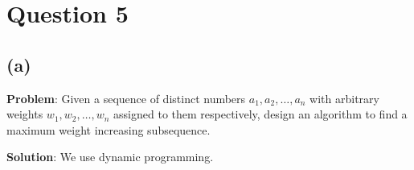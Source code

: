 \documentclass[11pt, fleqn]{article}
\begin{document}




\newpage 
\section*{Question 5}
\label{q5}
\setcounter{equation}{0}

\subsection*{(a)}

\textbf{Problem}: Given a sequence of distinct numbers $a_1, a_2, \dots, a_n$ with arbitrary weights $w_1, w_2, \dots, w_n$ assigned
to them respectively, design an algorithm to find a maximum weight increasing subsequence.

\bigskip

\textbf{Solution}: We use dynamic programming.
\end{document}
